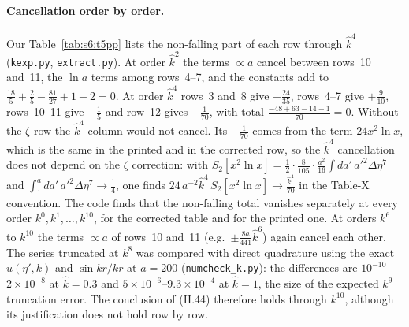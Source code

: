 \documentclass[aps,prd,onecolumn,10pt,nofootinbib,floatfix]{revtex4-2}
\newcommand{\eqII}[1]{(II.#1)}
\newcommand{\khat}{\hat k}
\begin{document}
\paragraph*{Cancellation order by order.}
Our Table~\ref{tab:s6:t5pp} lists the non-falling part of each row through $\khat^4$ (\texttt{kexp.py}, \texttt{extract.py}).
At order $\khat^2$ the terms $\propto a$ cancel between rows~10 and~11, the $\ln a$ terms among rows~4--7, and the
constants add to $\frac{18}5+\frac25-\frac{81}{27}+1-2=0$. At order $\khat^4$ rows~3 and~8 give $-\frac{24}{35}$, rows~4--7
give $+\frac9{10}$, rows~10--11 give $-\frac15$ and row~12 gives $-\frac1{70}$, with total $\frac{-48+63-14-1}{70}=0$.
Without the $\zeta$ row the $\khat^4$ column would not cancel. Its $-\frac1{70}$ comes from the term $24x^2\ln x$, which
is the same in the printed and in the corrected row, so the $\khat^4$ cancellation does not depend on the $\zeta$ correction: with
$S_2[x^2\ln x]=\frac12\cdot\frac8{105}\cdot\frac{a^2}{16}\int da'\,a'^2\Delta\eta^7$ and
$\int_1^a da'\,a'^2\Delta\eta^7\to\frac14$, one finds $24\,a^{-2}\khat^4\,S_2[x^2\ln x]\to\frac{\khat^4}{70}$ in the
Table-X convention. The code finds that the non-falling total vanishes separately at every order
$k^0,k^1,\dots,k^{10}$, for the corrected table and for the printed one. At orders $k^6$ to $k^{10}$ the terms
$\propto a$ of rows~10 and~11 (e.g.\ $\pm\frac{8a}{441}\khat^6$) again cancel each other. The series truncated at $k^8$ was
compared with direct quadrature using the exact $u(\eta',k)$ and $\sin kr/kr$ at $a=200$ (\texttt{numcheck\_k.py}): the
differences are $10^{-10}$--$2\times10^{-8}$ at $\khat=0.3$ and $5\times10^{-6}$--$9.3\times10^{-4}$ at $\khat=1$, the size
of the expected $k^9$ truncation error. The conclusion of \eqII{44} therefore holds through $k^{10}$, although its
justification does not hold row by row.
\end{document}
